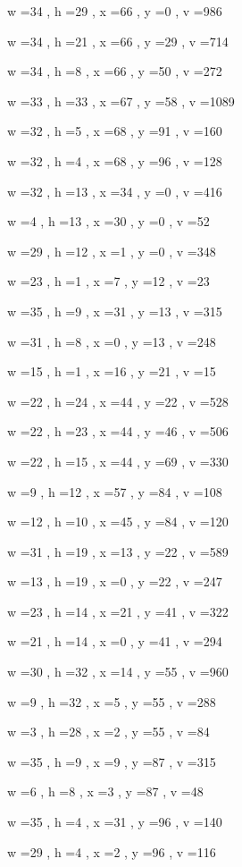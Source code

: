 \documentclass[11pt]{article}
\begin{document}
w =34 , h =29 , x =66 , y =0 , v =986
\par
w =34 , h =21 , x =66 , y =29 , v =714
\par
w =34 , h =8 , x =66 , y =50 , v =272
\par
w =33 , h =33 , x =67 , y =58 , v =1089
\par
w =32 , h =5 , x =68 , y =91 , v =160
\par
w =32 , h =4 , x =68 , y =96 , v =128
\par
w =32 , h =13 , x =34 , y =0 , v =416
\par
w =4 , h =13 , x =30 , y =0 , v =52
\par
w =29 , h =12 , x =1 , y =0 , v =348
\par
w =23 , h =1 , x =7 , y =12 , v =23
\par
w =35 , h =9 , x =31 , y =13 , v =315
\par
w =31 , h =8 , x =0 , y =13 , v =248
\par
w =15 , h =1 , x =16 , y =21 , v =15
\par
w =22 , h =24 , x =44 , y =22 , v =528
\par
w =22 , h =23 , x =44 , y =46 , v =506
\par
w =22 , h =15 , x =44 , y =69 , v =330
\par
w =9 , h =12 , x =57 , y =84 , v =108
\par
w =12 , h =10 , x =45 , y =84 , v =120
\par
w =31 , h =19 , x =13 , y =22 , v =589
\par
w =13 , h =19 , x =0 , y =22 , v =247
\par
w =23 , h =14 , x =21 , y =41 , v =322
\par
w =21 , h =14 , x =0 , y =41 , v =294
\par
w =30 , h =32 , x =14 , y =55 , v =960
\par
w =9 , h =32 , x =5 , y =55 , v =288
\par
w =3 , h =28 , x =2 , y =55 , v =84
\par
w =35 , h =9 , x =9 , y =87 , v =315
\par
w =6 , h =8 , x =3 , y =87 , v =48
\par
w =35 , h =4 , x =31 , y =96 , v =140
\par
w =29 , h =4 , x =2 , y =96 , v =116
\par
\newpage
\end{document}
